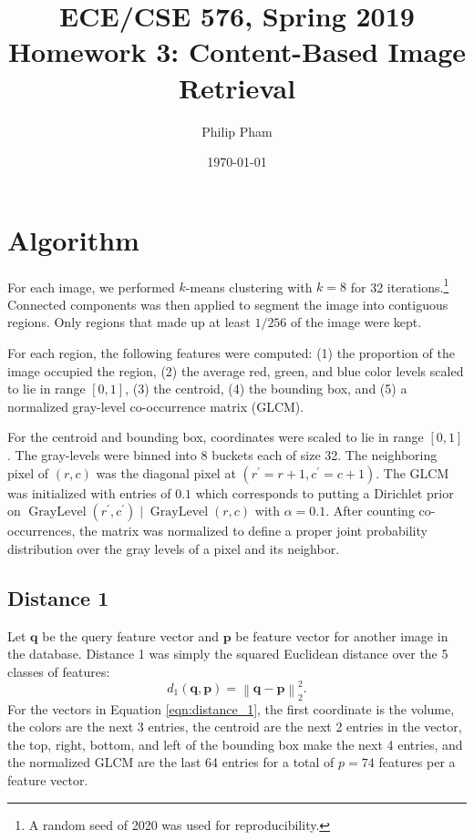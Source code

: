 \documentclass[letterpaper]{article}
\title{ECE/CSE 576, Spring 2019 Homework 3: Content-Based Image Retrieval}
\author{Philip Pham}
\date{\today}
\begin{document}
\maketitle

\section{Algorithm}

For each image, we performed $k$-means clustering with $k = 8$ for 32
iterations.\footnote{A random seed of 2020 was used for reproducibility.}
Connected components was then applied to segment the image into contiguous
regions. Only regions that made up at least $1/256$ of the image were kept.

For each region, the following features were computed: (1) the proportion of the
image occupied the region, (2) the average red, green, and blue color levels
scaled to lie in range $[0,1]$, (3) the centroid, (4) the bounding box, and (5)
a normalized gray-level co-occurrence matrix (GLCM).

For the centroid and bounding box, coordinates were scaled to lie in range
$[0, 1]$. The gray-levels were binned into 8 buckets each of size 32. The
neighboring pixel of $(r, c)$ was the diagonal pixel at
$\left(r^\prime = r + 1, c^\prime = c + 1\right)$. The GLCM was initialized with
entries of $0.1$ which corresponds to putting a Dirichlet prior on
$\operatorname{GrayLevel}\left(r^\prime, c^\prime\right) \mid
\operatorname{GrayLevel}\left(r, c\right)$ with $\alpha = 0.1$. After counting
co-occurrences, the matrix was normalized to define a proper joint probability
distribution over the gray levels of a pixel and its neighbor.

\subsection{Distance 1}

Let $\mathbf{q}$ be the query feature vector and $\mathbf{p}$ be feature vector
for another image in the database. Distance 1 was simply the squared Euclidean
distance over the 5 classes of features:
\begin{equation}
  d_1\left(\mathbf{q}, \mathbf{p}\right) = \left\lVert \mathbf{q} - \mathbf{p}\right\rVert_2^2.
  \label{eqn:distance_1}
\end{equation}
For the vectors in Equation \ref{eqn:distance_1}, the first coordinate is the
volume, the colors are the next 3 entries, the centroid are the next 2 entries
in the vector, the top, right, bottom, and left of the bounding box make the
next 4 entries, and the normalized GLCM are the last 64 entries for a total of
$p = 74$ features per a feature vector.
\end{document}
